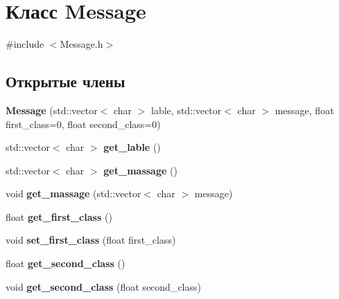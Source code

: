 \hypertarget{class_message}{}\section{Класс Message}
\label{class_message}


{\ttfamily \#include $<$Message.\+h$>$}

\subsection*{Открытые члены}
\begin{DoxyCompactItemize}
\item 
\mbox{\label{class_message_a4d3bec2b8b4a60d0a2505cab71ac43c6}} 
{\bfseries Message} (std\+::vector$<$ char $>$ lable, std\+::vector$<$ char $>$ message, float first\+\_\+class=0, float second\+\_\+class=0)
\item 
\mbox{\label{class_message_a4a0a3ab72f842da9bba77242dcc233ba}} 
std\+::vector$<$ char $>$ {\bfseries get\+\_\+lable} ()
\item 
\mbox{\label{class_message_a19405ffc1c8399841f169751d3253ed7}} 
std\+::vector$<$ char $>$ {\bfseries get\+\_\+massage} ()
\item 
\mbox{\label{class_message_a4785ba800ecde9660a97bd8f33293094}} 
void {\bfseries get\+\_\+massage} (std\+::vector$<$ char $>$ message)
\item 
\mbox{\label{class_message_a255fb6f094bfaab61209d63408e5117e}} 
float {\bfseries get\+\_\+first\+\_\+class} ()
\item 
\mbox{\label{class_message_adbdba18d32b805be4fe2d48475514edc}} 
void {\bfseries set\+\_\+first\+\_\+class} (float first\+\_\+class)
\item 
\mbox{\label{class_message_a25bbcd4288aba998f403fb822fe05a98}} 
float {\bfseries get\+\_\+second\+\_\+class} ()
\item 
\mbox{\label{class_message_a63777d2455e6ab75eda2d802e0b365c9}} 
void {\bfseries get\+\_\+second\+\_\+class} (float second\+\_\+class)
\end{DoxyCompactItemize}


